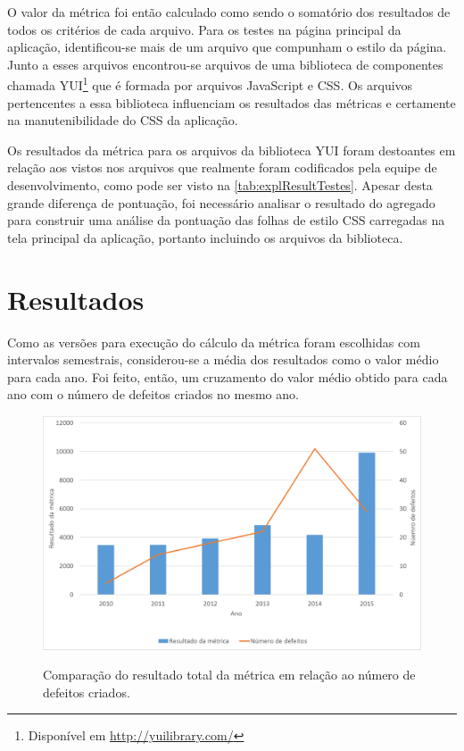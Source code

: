 O valor da métrica foi então calculado como sendo o somatório dos resultados de todos os critérios de cada arquivo. %
Para os testes na página principal da aplicação, identificou-se mais de um arquivo que compunham o estilo da página. Junto a esses arquivos encontrou-se arquivos de uma biblioteca de componentes chamada YUI\footnote{Disponível em \url{http://yuilibrary.com/}} que é formada por arquivos JavaScript e CSS. Os arquivos pertencentes a essa biblioteca influenciam os resultados das métricas e certamente na manutenibilidade do CSS da aplicação.



Os resultados da métrica para os arquivos da biblioteca YUI foram destoantes em relação aos vistos nos arquivos que realmente foram codificados pela equipe de desenvolvimento, como pode ser visto na \autoref{tab:explResultTestes}. Apesar desta grande diferença de pontuação, foi necessário  analisar o resultado do agregado para construir uma análise da pontuação das folhas de estilo CSS carregadas na tela principal da aplicação, portanto incluindo os arquivos da biblioteca.

\section{Resultados}

Como as versões para execução do cálculo da métrica foram escolhidas com intervalos semestrais, considerou-se a média dos resultados como o valor médio para cada ano. Foi feito, então, um cruzamento do valor médio obtido para cada ano com o número de defeitos criados no mesmo ano.

\begin{figure}[!htbp]
	\centering
	\caption{Comparação do resultado total da métrica em relação ao número de defeitos criados.}
	\includegraphics[width=1\textwidth]{./04-figuras/total_issues}
	\label{fig:totalXIssue}
\end{figure}

